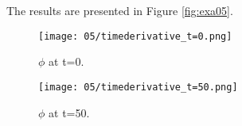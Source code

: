 \documentclass[11pt,letterpaper]{article}
\begin{document}
The results are presented in Figure \ref{fig:exa05}.
\begin{figure*}[!h]
	\centering
	\begin{subfigure}[t]{0.4\textwidth}
		\centering
		\texttt{[image: 05/timederivative\_t=0.png]} 
		\caption{$\phi$ at t=0.}
		\label{fig:exa01-flux1}
	\end{subfigure}
	\vspace{1cm}
	\begin{subfigure}[t]{0.4\textwidth}
		\centering
		\texttt{[image: 05/timederivative\_t=50.png]} 
		\caption{$\phi$ at t=50.}
		\label{fig:exa01-flux2}
	\end{subfigure}
	\hfill
	\caption{Flux.}
	\label{fig:exa05}
\end{figure*}
\end{document}
